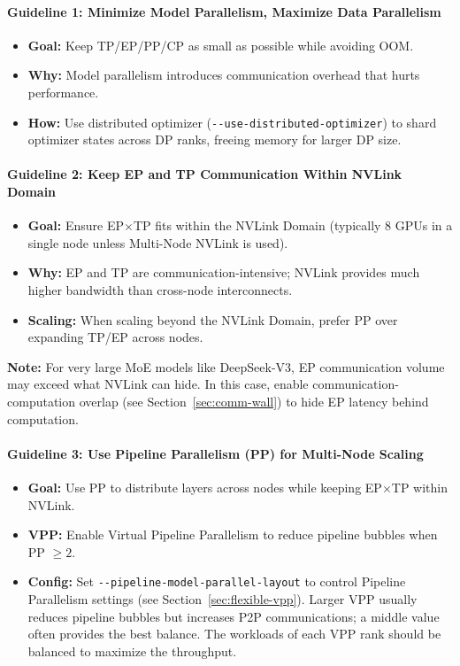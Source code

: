 \paragraph*{Guideline 1: Minimize Model Parallelism, Maximize Data Parallelism}
\begin{itemize}
    \item \textbf{Goal:} Keep TP/EP/PP/CP as small as possible while avoiding OOM.
    \item \textbf{Why:} Model parallelism introduces communication overhead that hurts performance.
    \item \textbf{How:} Use distributed optimizer (\texttt{-{}-use-distributed-optimizer}) to shard optimizer states across DP ranks, freeing memory for larger DP size.
\end{itemize}

\paragraph*{Guideline 2: Keep EP and TP Communication Within NVLink Domain}
\begin{itemize}
    \item \textbf{Goal:} Ensure EP$\times$TP fits within the NVLink Domain (typically 8 GPUs in a single node unless Multi-Node NVLink is used).
    \item \textbf{Why:} EP and TP are communication-intensive; NVLink provides much higher bandwidth than cross-node interconnects.
    \item \textbf{Scaling:} When scaling beyond the NVLink Domain, prefer PP over expanding TP/EP across nodes.
\end{itemize}

\noindent\textbf{Note:} For very large MoE models like DeepSeek-V3, EP communication volume may exceed what NVLink can hide. In this case, enable communication-computation overlap (see Section~\ref{sec:comm-wall}) to hide EP latency behind computation.

\paragraph*{Guideline 3: Use Pipeline Parallelism (PP) for Multi-Node Scaling}
\begin{itemize}
    \item \textbf{Goal:} Use PP to distribute layers across nodes while keeping EP$\times$TP within NVLink.
    \item \textbf{VPP:} Enable Virtual Pipeline Parallelism to reduce pipeline bubbles when PP $\geq 2$.
    \item \textbf{Config:} Set \texttt{-{}-pipeline-model-parallel-layout} to control Pipeline Parallelism settings (see Section~\ref{sec:flexible-vpp}). Larger VPP usually reduces pipeline bubbles but increases P2P communications; a middle value often provides the best balance. The workloads of each VPP rank should be balanced to maximize the throughput.
\end{itemize}

